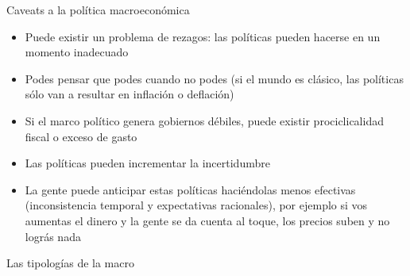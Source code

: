 \documentclass{beamer}
\begin{document}
\begin{frame}{Caveats a la política macroeconómica}

    \begin{itemize}
    \item Puede existir un problema de rezagos: las políticas pueden hacerse en un momento inadecuado
    \item Podes pensar que podes cuando no podes (si el mundo es clásico, las políticas sólo van a resultar en inflación o deflación)
    \item Si el marco político genera gobiernos débiles, puede existir prociclicalidad fiscal o exceso de gasto
    \item Las políticas pueden incrementar la incertidumbre
    \item La gente puede anticipar estas políticas haciéndolas menos efectivas (inconsistencia temporal y expectativas racionales), por ejemplo si vos aumentas el dinero y la gente se da cuenta al toque, los precios suben y no lográs nada
    \end{itemize}

\end{frame}
\begin{frame}{Las tipologías de la macro}
\begin{table}[]
\end{table}

\end{frame}
\end{document}
